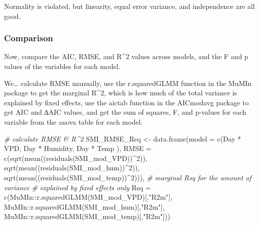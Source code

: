 \documentclass[
]{article}
\newenvironment{Shaded}{\begin{snugshade}}{\end{snugshade}}
\newcommand{\AttributeTok}[1]{\textcolor[rgb]{0.77,0.63,0.00}{#1}}
\newcommand{\CommentTok}[1]{\textcolor[rgb]{0.56,0.35,0.01}{\textit{#1}}}
\newcommand{\DecValTok}[1]{\textcolor[rgb]{0.00,0.00,0.81}{#1}}
\newcommand{\FunctionTok}[1]{\textcolor[rgb]{0.00,0.00,0.00}{#1}}
\newcommand{\NormalTok}[1]{#1}
\newcommand{\OtherTok}[1]{\textcolor[rgb]{0.56,0.35,0.01}{#1}}
\newcommand{\SpecialCharTok}[1]{\textcolor[rgb]{0.00,0.00,0.00}{#1}}
\newcommand{\StringTok}[1]{\textcolor[rgb]{0.31,0.60,0.02}{#1}}
\begin{document}
Normality is violated, but linearity, equal error variance, and
independence are all good.

\hypertarget{comparison}{%
\subsubsection{Comparison}\label{comparison}}

Now, compare the AIC, RMSE, and R\^{}2 values across models, and the F
and p values of the variables for each model.

We\ldots{} calculate RMSE manually, use the r.squaredGLMM function in
the MuMIn package to get the marginal R\^{}2, which is how much of the
total variance is explained by fixed effects, use the aictab function in
the AICmodavg package to get AIC and ∆AIC values, and get the sum of
squares, F, and p-values for each variable from the anova table for each
model.

\begin{Shaded}
\begin{Highlighting}[]
\CommentTok{\# calculate RMSE \& R\^{}2}
\NormalTok{SMI\_RMSE\_Rsq }\OtherTok{\textless{}{-}} \FunctionTok{data.frame}\NormalTok{(}\AttributeTok{model =} 
                               \FunctionTok{c}\NormalTok{(}\StringTok{\textquotesingle{}Day * VPD\textquotesingle{}}\NormalTok{,}
                                 \StringTok{\textquotesingle{}Day * Humidity\textquotesingle{}}\NormalTok{,}
                                 \StringTok{\textquotesingle{}Day * Temp\textquotesingle{}}
\NormalTok{                                 ),}
                           \AttributeTok{RMSE =} \FunctionTok{c}\NormalTok{(}\FunctionTok{sqrt}\NormalTok{(}\FunctionTok{mean}\NormalTok{((}\FunctionTok{residuals}\NormalTok{(SMI\_mod\_VPD))}\SpecialCharTok{\^{}}\DecValTok{2}\NormalTok{)),}
                                    \FunctionTok{sqrt}\NormalTok{(}\FunctionTok{mean}\NormalTok{((}\FunctionTok{residuals}\NormalTok{(SMI\_mod\_hum))}\SpecialCharTok{\^{}}\DecValTok{2}\NormalTok{)),}
                                    \FunctionTok{sqrt}\NormalTok{(}\FunctionTok{mean}\NormalTok{((}\FunctionTok{residuals}\NormalTok{(SMI\_mod\_temp))}\SpecialCharTok{\^{}}\DecValTok{2}\NormalTok{))),}
                           \CommentTok{\# marginal Rsq for the amount of variance}
                           \CommentTok{\# explained by fixed effects only}
                           \AttributeTok{Rsq =} \FunctionTok{c}\NormalTok{(MuMIn}\SpecialCharTok{::}\FunctionTok{r.squaredGLMM}\NormalTok{(SMI\_mod\_VPD)[,}\StringTok{"R2m"}\NormalTok{],}
\NormalTok{                                   MuMIn}\SpecialCharTok{::}\FunctionTok{r.squaredGLMM}\NormalTok{(SMI\_mod\_hum)[,}\StringTok{"R2m"}\NormalTok{],}
\NormalTok{                                   MuMIn}\SpecialCharTok{::}\FunctionTok{r.squaredGLMM}\NormalTok{(SMI\_mod\_temp)[,}\StringTok{"R2m"}\NormalTok{]))}
\end{Highlighting}
\end{Shaded}
\end{document}

